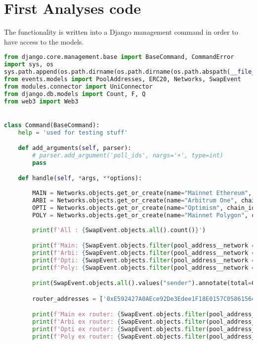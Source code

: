 \newpage
\chapter{First Analyses code}
\label{APP:analysis1}
The functionality is written into a Django management command in order to have access to the models.

\begin{lstlisting}[language=python]
from django.core.management.base import BaseCommand, CommandError
import sys, os
sys.path.append(os.path.dirname(os.path.dirname(os.path.abspath(__file__))))
from events.models import PoolAddresses, ERC20, Networks, SwapEvent
from modules.connector import UniConnector
from django.db.models import Count, F, Q
from web3 import Web3


class Command(BaseCommand):
    help = 'used for testing stuff'

    def add_arguments(self, parser):
        # parser.add_argument('poll_ids', nargs='+', type=int)
        pass

    def handle(self, *args, **options):
        
        MAIN = Networks.objects.get_or_create(name="Mainnet Ethereum", chain_id=1, short="MAIN")[0]
        ARBI = Networks.objects.get_or_create(name="Arbitrum One", chain_id=42161, short="ARBI")[0]
        OPTI = Networks.objects.get_or_create(name="Optimism", chain_id=10, short="OPTI")[0]
        POLY = Networks.objects.get_or_create(name="Mainnet Polygon", chain_id=137, short="POLY")[0]
        
        print(f'All : {SwapEvent.objects.all().count()}')

        print(f'Main: {SwapEvent.objects.filter(pool_address__network = MAIN ).count()}')
        print(f'Arbi: {SwapEvent.objects.filter(pool_address__network = ARBI ).count()}')
        print(f'Opti: {SwapEvent.objects.filter(pool_address__network = OPTI ).count()}')
        print(f'Poly: {SwapEvent.objects.filter(pool_address__network = POLY ).count()}')

        print(SwapEvent.objects.all().values("sender").annotate(total=Count('sender')))

        router_addresses = ['0xE592427A0AEce92De3Edee1F18E0157C05861564', '0x68b3465833fb72A70ecDF485E0e4C7bD8665Fc45', '0x1111111254fb6c44bAC0beD2854e76F90643097d']

        print(f'Main ex router: {SwapEvent.objects.filter(pool_address__network = MAIN ).exclude(sender__in=router_addresses).count()}')
        print(f'Arbi ex router: {SwapEvent.objects.filter(pool_address__network = ARBI ).exclude(sender__in=router_addresses).count()}')
        print(f'Opti ex router: {SwapEvent.objects.filter(pool_address__network = OPTI ).exclude(sender__in=router_addresses).count()}')
        print(f'Poly ex router: {SwapEvent.objects.filter(pool_address__network = POLY ).exclude(sender__in=router_addresses).count()}')


\end{lstlisting}
